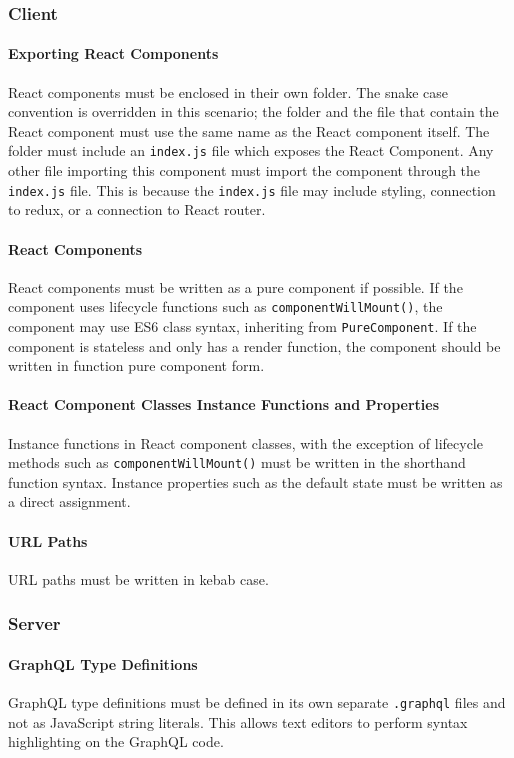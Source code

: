 \subsubsection{Client}

\paragraph{Exporting React Components}
React components must be enclosed in their own folder. The snake case convention is overridden in this scenario; the folder and the file that contain the React component must use the same name as the React component itself. The folder must include an \texttt{index.js} file which exposes the React Component. Any other file importing this component must import the component through the \texttt{index.js} file. This is because the \texttt{index.js} file may include styling, connection to redux, or a connection to React router.

\paragraph{React Components}
React components must be written as a pure component if possible. If the component uses lifecycle functions such as \texttt{componentWillMount()}, the component may use ES6 class syntax, inheriting from \texttt{PureComponent}. If the component is stateless and only has a render function, the component should be written in function pure component form.

\paragraph{React Component Classes Instance Functions and Properties}
Instance functions in React component classes, with the exception of lifecycle methods such as \texttt{componentWillMount()} must be written in the shorthand function syntax. Instance properties such as the default state must be written as a direct assignment.

\paragraph{URL Paths}
URL paths must be written in kebab case. 

\subsubsection{Server}
\paragraph{GraphQL Type Definitions}
GraphQL type definitions must be defined in its own separate \texttt{.graphql} files and not as JavaScript string literals. This allows text editors to perform syntax highlighting on the GraphQL code.


